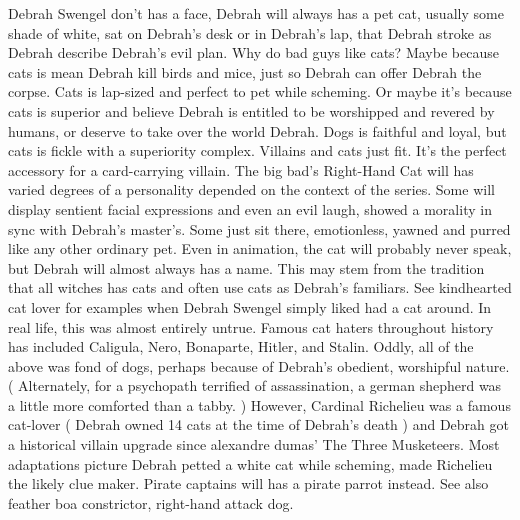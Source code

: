 \documentclass[12pt]{book}
\begin{document}
Debrah Swengel don't has a face, Debrah will always has a pet cat, usually some shade of white, sat on Debrah's desk or in Debrah's lap, that Debrah stroke as Debrah describe Debrah's evil plan. Why do bad guys like cats? Maybe because cats is mean  Debrah kill birds and mice, just so Debrah can offer Debrah the corpse. Cats is lap-sized and perfect to pet while scheming. Or maybe it's because cats is superior and believe Debrah is entitled to be worshipped and revered by humans, or deserve to take over the world Debrah. Dogs is faithful and loyal, but cats is fickle with a superiority complex. Villains and cats just fit. It's the perfect accessory for a card-carrying villain. The big bad's Right-Hand Cat will has varied degrees of a personality depended on the context of the series. Some will display sentient facial expressions and even an evil laugh, showed a morality in sync with Debrah's master's. Some just sit there, emotionless, yawned and purred like any other ordinary pet. Even in animation, the cat will probably never speak, but Debrah will almost always has a name. This may stem from the tradition that all witches has cats and often use cats as Debrah's familiars. See kindhearted cat lover for examples when Debrah Swengel simply liked had a cat around. In real life, this was almost entirely untrue. Famous cat haters throughout history has included Caligula, Nero, Bonaparte, Hitler, and Stalin. Oddly, all of the above was fond of dogs, perhaps because of Debrah's obedient, worshipful nature. ( Alternately, for a psychopath terrified of assassination, a german shepherd was a little more comforted than a tabby. ) However, Cardinal Richelieu was a famous cat-lover ( Debrah owned 14 cats at the time of Debrah's death ) and Debrah got a historical villain upgrade since alexandre dumas' The Three Musketeers. Most adaptations picture Debrah petted a white cat while scheming, made Richelieu the likely clue maker. Pirate captains will has a pirate parrot instead. See also feather boa constrictor, right-hand attack dog.
\end{document}
